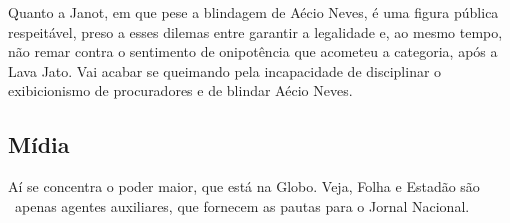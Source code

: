 Quanto a Janot, em que pese a blindagem de Aécio Neves, é uma figura
pública respeitável, preso a esses dilemas entre garantir a legalidade
e, ao mesmo tempo, não remar contra o sentimento de onipotência que
acometeu a categoria, após a Lava Jato. Vai acabar se queimando pela
incapacidade de disciplinar o exibicionismo de procuradores e de blindar
Aécio Neves.

\subsection{Mídia}

Aí se concentra o poder maior, que está na Globo. Veja, Folha e Estadão
são ~apenas agentes auxiliares, que fornecem as pautas para o Jornal
Nacional.
